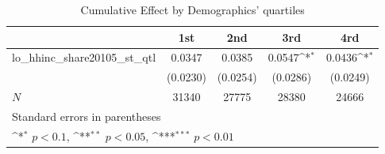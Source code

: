 \begin{table}[htbp]\centering
\def\sym#1{\ifmmode^{#1}\else\(^{#1}\)\fi}
\caption{Cumulative Effect by Demographics' quartiles}
\begin{tabular}{l*{4}{c}}
\hline\hline
            &\multicolumn{1}{c}{1st}&\multicolumn{1}{c}{2nd}&\multicolumn{1}{c}{3rd}&\multicolumn{1}{c}{4rd}\\
\hline
lo\_hhinc\_share20105\_st\_qtl&      0.0347         &      0.0385         &      0.0547\sym{*}  &      0.0436\sym{*}  \\
            &    (0.0230)         &    (0.0254)         &    (0.0286)         &    (0.0249)         \\
\hline
\(N\)       &       31340         &       27775         &       28380         &       24666         \\
\hline\hline
\multicolumn{5}{l}{\footnotesize Standard errors in parentheses}\\
\multicolumn{5}{l}{\footnotesize \sym{*} \(p<0.1\), \sym{**} \(p<0.05\), \sym{***} \(p<0.01\)}\\
\end{tabular}
\end{table}
